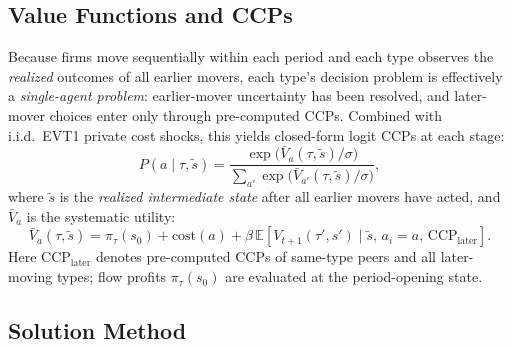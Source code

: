 \documentclass[12pt]{article}
\begin{document}
\subsection{Value Functions and CCPs}

Because firms move sequentially within each period and each type observes
the \emph{realized} outcomes of all earlier movers, each type's decision
problem is effectively a \textit{single-agent problem}: earlier-mover
uncertainty has been resolved, and later-mover choices enter only through
pre-computed CCPs. Combined with i.i.d.\ EVT1 private cost shocks, this
yields closed-form logit CCPs at each stage:
\begin{equation}
  P(a \mid \tau, \tilde{s}) = \frac{\exp\!\bigl(\bar{V}_{a}(\tau,\tilde{s})/\sigma\bigr)}
                           {\sum_{a'} \exp\!\bigl(\bar{V}_{a'}(\tau,\tilde{s})/\sigma\bigr)},
\end{equation}
where $\tilde{s}$ is the \emph{realized intermediate state} after all
earlier movers have acted, and $\bar{V}_a$ is the systematic utility:
\begin{equation}
  \bar{V}_a(\tau, \tilde{s}) = \pi_\tau(s_0) + \text{cost}(a) + \beta \,
  \mathbb{E}\!\left[ V_{t+1}(\tau', s') \mid \tilde{s},\, a_i = a,\, \mathrm{CCP}_{\text{later}} \right].
\end{equation}
Here $\mathrm{CCP}_{\text{later}}$ denotes pre-computed CCPs of same-type
peers and all later-moving types; flow profits $\pi_\tau(s_0)$ are evaluated
at the period-opening state.

\subsection{Solution Method}
\end{document}
